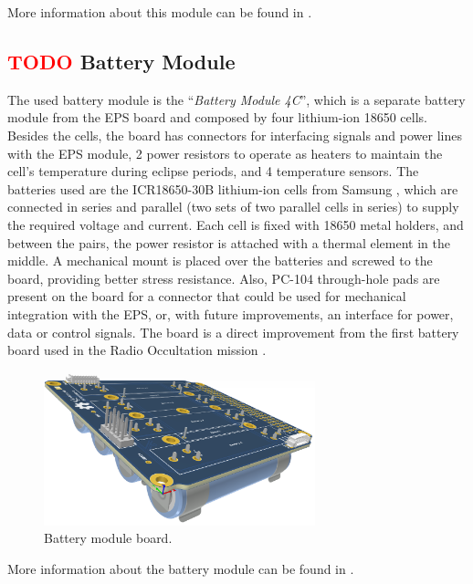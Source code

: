 More information about this module can be found in \cite{eps2}.

\subsection{ \textcolor{red}{TODO} Battery Module} \label{ssec:battery-module}

The used battery module is the ``\textit{Battery Module 4C}'', which is a separate battery module from the EPS board and composed by four lithium-ion 18650 cells. Besides the cells, the board has connectors for interfacing signals and power lines with the EPS module, 2 power resistors to operate as heaters to maintain the cell's temperature during eclipse periods, and 4 temperature sensors. The batteries used are the ICR18650-30B lithium-ion cells from Samsung \cite{icr18650-30b}, which are connected in series and parallel (two sets of two parallel cells in series) to supply the required voltage and current. Each cell is fixed with 18650 metal holders, and between the pairs, the power resistor is attached with a thermal element in the middle. A mechanical mount is placed over the batteries and screwed to the board, providing better stress resistance. Also, PC-104 through-hole pads are present on the board for a connector that could be used for mechanical integration with the EPS, or, with future improvements, an interface for power, data or control signals. The board is a direct improvement from the first battery board used in the Radio Occultation mission \cite{floripasat}.

\begin{figure}[!ht]
    \begin{center}
        \includegraphics[width=0.7\textwidth]{figures/subsystems/bat2-pcb-3d}
        \caption{Battery module board.}
        \label{fig:battery-module-board}
    \end{center}
\end{figure}

More information about the battery module can be found in \cite{bat4c}.


